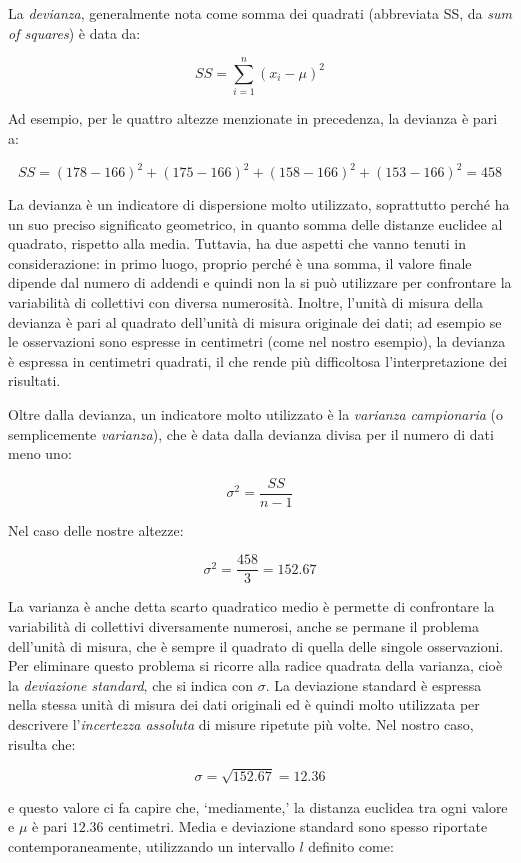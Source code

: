 \documentclass[a4paper,12pt,oneside]{book}
\begin{document}
La \emph{devianza}, generalmente nota come somma dei quadrati (abbreviata SS, da \emph{sum of squares}) è data da:

\[SS = \sum\limits_{i = 1}^n {(x_i  - \mu)^2 }\]

Ad esempio, per le quattro altezze menzionate in precedenza, la devianza è pari a:

\[SS = \left(178 - 166 \right)^2 + \left(175 - 166 \right)^2 + \left(158 - 166 \right)^2  + \left(153 - 166 \right)^2 = 458\]

La devianza è un indicatore di dispersione molto utilizzato, soprattutto perché ha un suo preciso significato geometrico, in quanto somma delle distanze euclidee al quadrato, rispetto alla media. Tuttavia, ha due aspetti che vanno tenuti in considerazione: in primo luogo, proprio perché è una somma, il valore finale dipende dal numero di addendi e quindi non la si può utilizzare per confrontare la variabilità di collettivi con diversa numerosità. Inoltre, l'unità di misura della devianza è pari al quadrato dell'unità di misura originale dei dati; ad esempio se le osservazioni sono espresse in centimetri (come nel nostro esempio), la devianza è espressa in centimetri quadrati, il che rende più difficoltosa l'interpretazione dei risultati.

Oltre dalla devianza, un indicatore molto utilizzato è la \emph{varianza campionaria} (o semplicemente \emph{varianza}), che è data dalla devianza divisa per il numero di dati meno uno:

\[\sigma^2  = \frac{SS}{n - 1}\]

Nel caso delle nostre altezze:

\[\sigma^2  = \frac{458}{3} = 152.67\]

La varianza è anche detta scarto quadratico medio è permette di confrontare la variabilità di collettivi diversamente numerosi, anche se permane il problema dell'unità di misura, che è sempre il quadrato di quella delle singole osservazioni. Per eliminare questo problema si ricorre alla radice quadrata della varianza, cioè la \emph{deviazione standard}, che si indica con \(\sigma\). La deviazione standard è espressa nella stessa unità di misura dei dati originali ed è quindi molto utilizzata per descrivere l'\emph{incertezza assoluta} di misure ripetute più volte. Nel nostro caso, risulta che:

\[\sigma  = \sqrt{152.67} = 12.36\]

e questo valore ci fa capire che, `mediamente,' la distanza euclidea tra ogni valore e \(\mu\) è pari \(12.36\) centimetri. Media e deviazione standard sono spesso riportate contemporaneamente, utilizzando un intervallo \(l\) definito come:
\end{document}
